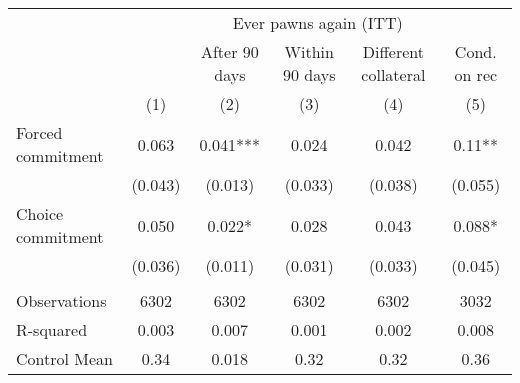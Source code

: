 \begin{tabular}{lccccc}
\toprule
      & \multicolumn{5}{c}{Ever pawns again (ITT)} \\
\cmidrule{2-6}      &       & After 90 days & Within 90 days & Different collateral & Cond. on rec \\
\midrule
\midrule
      & (1)   & (2)   & (3)   & (4)   & (5) \\
\midrule
\midrule
Forced commitment & 0.063 & 0.041*** & 0.024 & 0.042 & 0.11** \\
      & (0.043) & (0.013) & (0.033) & (0.038) & (0.055) \\
Choice commitment & 0.050 & 0.022* & 0.028 & 0.043 & 0.088* \\
      & (0.036) & (0.011) & (0.031) & (0.033) & (0.045) \\
      &       &       &       &       &  \\
\midrule
Observations & 6302  & 6302  & 6302  & 6302  & 3032 \\
R-squared & 0.003 & 0.007 & 0.001 & 0.002 & 0.008 \\
Control Mean & 0.34  & 0.018 & 0.32  & 0.32  & 0.36 \\
\bottomrule
\bottomrule
\end{tabular}%
